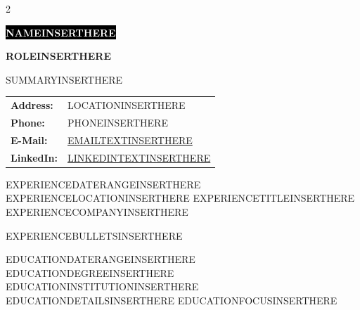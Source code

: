 \documentclass[10pt]{developercv}
\begin{document}
\begin{multicols}{2}

\begin{minipage}[t]{0.45\textwidth}

\colorbox{black}{{\huge\textcolor{white}{\textbf{\MakeUppercase{NAMEINSERTHERE}}}}}

\vspace{0.2cm}
{\large \textbf{ROLEINSERTHERE}}

\vspace{0.2cm}
SUMMARYINSERTHERE
\end{minipage}
\vfill\null
\columnbreak

\begin{minipage}[t]{0.55\textwidth}

\hspace{1.5cm}

\hspace{0.5cm}\begin{tabular}{@{}ll}
\textbf{Address:} & \hspace{0.1cm} LOCATIONINSERTHERE\\
\textbf{Phone:} & \hspace{0.1cm} PHONEINSERTHERE\\
\textbf{E-Mail:} & \hspace{0.1cm} \href{mailto:EMAILURLINSERTHERE}{EMAILTEXTINSERTHERE}\\
\textbf{LinkedIn:} & \hspace{0.1cm} \href{LINKEDINURLINSERTHERE}{LINKEDINTEXTINSERTHERE}\\
\end{tabular}

\end{minipage}

\end{multicols}

\begin{entrylist}
  \entry
  {EXPERIENCEDATERANGEINSERTHERE\\\footnotesize{EXPERIENCELOCATIONINSERTHERE}}
  {EXPERIENCETITLEINSERTHERE}
  {EXPERIENCECOMPANYINSERTHERE}
  {
  \begin{itemize}[leftmargin=*]
    EXPERIENCEBULLETSINSERTHERE
  \end{itemize}
  }
\end{entrylist}

\begin{entrylist}
  \entry
  {EDUCATIONDATERANGEINSERTHERE}
  {EDUCATIONDEGREEINSERTHERE}
  {EDUCATIONINSTITUTIONINSERTHERE}
  {EDUCATIONDETAILSINSERTHERE EDUCATIONFOCUSINSERTHERE}
\end{entrylist}
\end{document}
